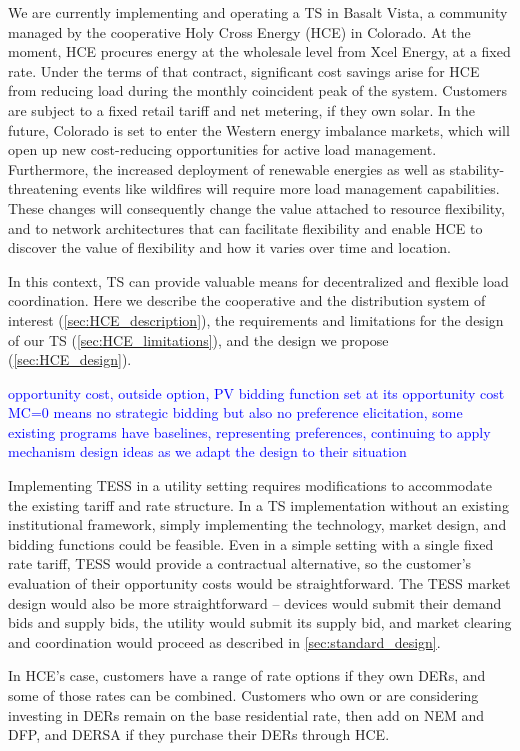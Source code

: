 We are currently implementing and operating a TS in Basalt Vista, a community managed by the cooperative Holy Cross Energy (HCE) in Colorado. At the moment, HCE procures energy at the wholesale level from Xcel Energy, at a fixed rate. Under the terms of that contract, significant cost savings arise for HCE from reducing load during the monthly coincident peak of the system. Customers are subject to a fixed retail tariff and net metering, if they own solar. In the future, Colorado is set to enter the Western energy imbalance markets, which will open up new cost-reducing opportunities for active load management. Furthermore, the increased deployment of renewable energies as well as stability-threatening events like wildfires will require more load management capabilities. These changes will consequently change the value attached to resource flexibility, and to network architectures that can facilitate flexibility and enable HCE to discover the value of flexibility and how it varies over time and location.

In this context, TS can provide valuable means for decentralized and flexible load coordination. Here we describe the cooperative and the distribution system of interest (\cref{sec:HCE_description}), the requirements and limitations for the design of our TS (\cref{sec:HCE_limitations}), and the design we propose (\cref{sec:HCE_design}).

\textcolor{blue}{opportunity cost, outside option, PV bidding function set at its opportunity cost MC=0 means no strategic bidding but also no preference elicitation, some existing programs have baselines, representing preferences, continuing to apply mechanism design ideas as we adapt the design to their situation}

Implementing TESS in a utility setting requires modifications to accommodate the existing tariff and rate structure. In a TS implementation without an existing institutional framework, simply implementing the technology, market design, and bidding functions could be feasible. Even in a simple setting with a single fixed rate tariff, TESS would provide a contractual alternative, so the customer's evaluation of their opportunity costs would be straightforward. The TESS market design would also be more straightforward -- devices would submit their demand bids and supply bids, the utility would submit its supply bid, and market clearing and coordination would proceed as described in \ref{sec:standard_design}.

In HCE's case, customers have a range of rate options if they own DERs, and some of those rates can be combined. Customers who own or are considering investing in DERs remain on the base residential rate, then add on NEM and DFP, and DERSA if they purchase their DERs through HCE.

